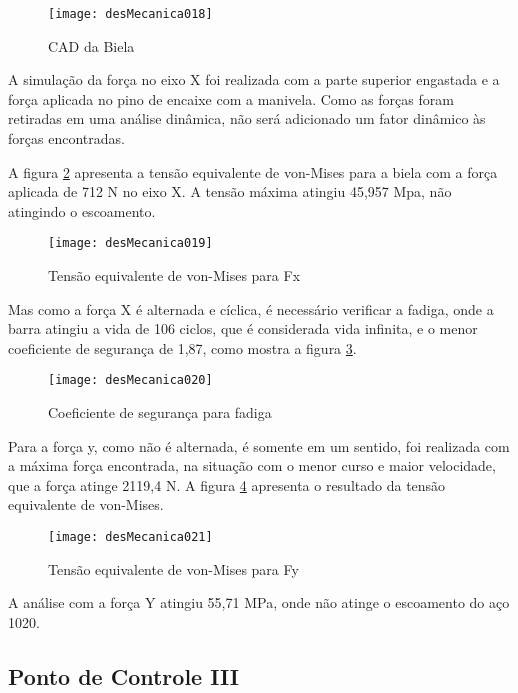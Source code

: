 		\newpage
		\begin{figure}[!h]
			\centering
			\texttt{[image: desMecanica018]}
			\caption{CAD da Biela}
			\label{desMecanica018}
		\end{figure}

		A simulação da força no eixo X foi realizada com a parte superior engastada e a força aplicada no pino de encaixe com a manivela. Como as forças foram retiradas em uma análise dinâmica, não será adicionado um fator dinâmico às forças encontradas.
		
		A figura \ref{desMecanica019} apresenta a tensão equivalente de von-Mises para a biela com a força aplicada de 712 N no eixo X. A tensão máxima atingiu 45,957 Mpa, não atingindo o escoamento.

		\newpage
		\begin{figure}[!h]
			\centering
			\texttt{[image: desMecanica019]}
			\caption{Tensão equivalente de von-Mises para Fx}
			\label{desMecanica019}
		\end{figure}

		Mas como a força X é alternada e cíclica, é necessário verificar a fadiga, onde a barra atingiu a vida de 106 ciclos, que é considerada vida infinita, e o menor coeficiente de segurança de 1,87, como mostra a figura \ref{desMecanica020}. 

		\newpage
		\begin{figure}[!h]
			\centering
			\texttt{[image: desMecanica020]}
			\caption{Coeficiente de segurança para fadiga}
			\label{desMecanica020}
		\end{figure}

		Para a força y, como não é alternada, é somente em um sentido, foi realizada com a máxima força encontrada, na situação com o menor curso e maior velocidade, que a força atinge 2119,4 N. A figura \ref{desMecanica021} apresenta o resultado da tensão equivalente de von-Mises.

		\newpage
		\begin{figure}[!h]
			\centering
			\texttt{[image: desMecanica021]}
			\caption{Tensão equivalente de von-Mises para Fy}
			\label{desMecanica021}
		\end{figure}

		A análise com a força Y atingiu 55,71 MPa, onde não atinge o escoamento do aço 1020.


\newpage
\subsection{Ponto de Controle III}
